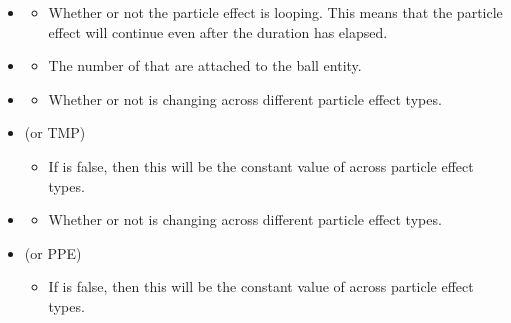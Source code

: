 \begin{singlespace}

	\begin{itemize}[nolistsep,topsep=5pt]
	\itemsep1.0em

		\item {}
		\begin{itemize}[nolistsep,topsep=0pt]
			\item Whether or not the particle effect is looping. This means that the particle effect will continue even after the duration has elapsed.
		\end{itemize}

		\item {}
		\begin{itemize}[nolistsep,topsep=0pt]
			\item The number of  that are attached to the ball entity.
		\end{itemize}

		\item {}
		\begin{itemize}[nolistsep,topsep=0pt]
			\item Whether or not  is changing across different particle effect types.
		\end{itemize}

		\item {} (or TMP)
		\begin{itemize}[nolistsep,topsep=0pt]
			\item If  is false, then this will be the constant value of  across particle effect types.
		\end{itemize}

		\item {}
		\begin{itemize}[nolistsep,topsep=0pt]
			\item Whether or not  is changing across different particle effect types.
		\end{itemize}

		\item {} (or PPE)
		\begin{itemize}[nolistsep,topsep=0pt]
			\item If  is false, then this will be the constant value of  across particle effect types.
		\end{itemize}


\end{itemize}
\end{singlespace}
